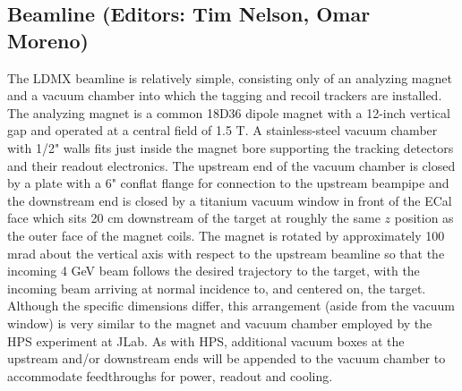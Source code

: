 \subsection{Beamline (Editors: Tim Nelson, Omar Moreno)}

The LDMX beamline is relatively simple, consisting only of an analyzing magnet
and a vacuum chamber into which the tagging and recoil trackers are installed.
The analyzing magnet is a common 18D36 dipole magnet with a 12-inch vertical 
gap and operated at a central field of 1.5 T.  A stainless-steel vacuum
chamber with 1/2" walls fits just inside the magnet bore supporting the
tracking detectors and their readout electronics. The upstream end of the
vacuum chamber is closed by a plate with a 6" conflat flange for connection to
the upstream beampipe and the downstream end is closed by a titanium vacuum
window in front of the ECal face which sits 20 cm downstream of the target
at roughly the same $z$ position as the outer face of the magnet coils.
The magnet is rotated by approximately 100 mrad about the vertical axis with
respect to the upstream beamline so that the incoming 4 GeV beam follows the
desired trajectory to the target, with the incoming beam arriving at normal
incidence to, and centered on, the target.  Although the specific dimensions
differ, this arrangement (aside from the vacuum window) is very similar
to the magnet and vacuum chamber employed by the HPS experiment at JLab.
As with HPS, additional vacuum boxes at the upstream and/or downstream ends
will be appended to the vacuum chamber to accommodate feedthroughs for power,
readout and cooling.



